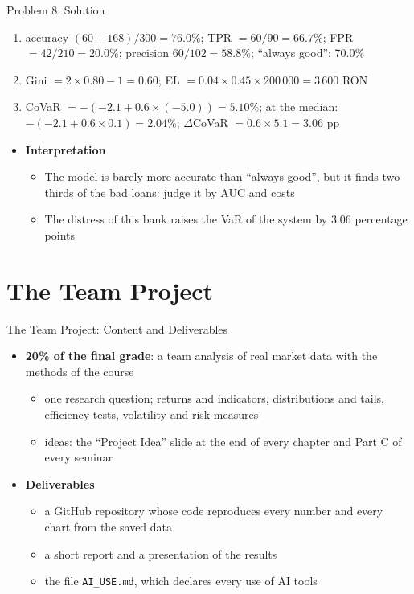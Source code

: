 \begin{frame}{Problem 8: Solution}
\itemsize{\footnotesize}
\begin{enumerate}
    \item accuracy $(60 + 168)/300 = 76.0\%$; TPR $= 60/90 = 66.7\%$; FPR $= 42/210 = 20.0\%$; precision $60/102 = 58.8\%$; ``always good'': 70.0\%
    \item Gini $= 2 \times 0.80 - 1 = 0.60$; EL $= 0.04 \times 0.45 \times 200\,000 = 3\,600$ RON
    \item CoVaR $= -(-2.1 + 0.6 \times (-5.0)) = 5.10\%$; at the median: $-(-2.1 + 0.6 \times 0.1) = 2.04\%$; $\Delta$CoVaR $= 0.6 \times 5.1 = 3.06$ pp
\end{enumerate}
\begin{itemize}
    \item \textbf{Interpretation}
    \begin{itemize}
        \item The model is barely more accurate than ``always good'', but it finds two thirds of the bad loans: judge it by AUC and costs
        \item The distress of this bank raises the VaR of the system by 3.06 percentage points
    \end{itemize}
\end{itemize}
\end{frame}


\section{The Team Project}

\begin{frame}{The Team Project: Content and Deliverables}
\itemsize{\small}
\begin{itemize}
    \item \textbf{20\% of the final grade}: a team analysis of real market data with the methods of the course
    \begin{itemize}
        \item one research question; returns and indicators, distributions and tails, efficiency tests, volatility and risk measures
        \item ideas: the ``Project Idea'' slide at the end of every chapter and Part C of every seminar
    \end{itemize}
    \item \textbf{Deliverables}
    \begin{itemize}
        \item a GitHub repository whose code reproduces every number and every chart from the saved data
        \item a short report and a presentation of the results
        \item the file \texttt{AI\_USE.md}, which declares every use of AI tools
    \end{itemize}
\end{itemize}
\end{frame}

